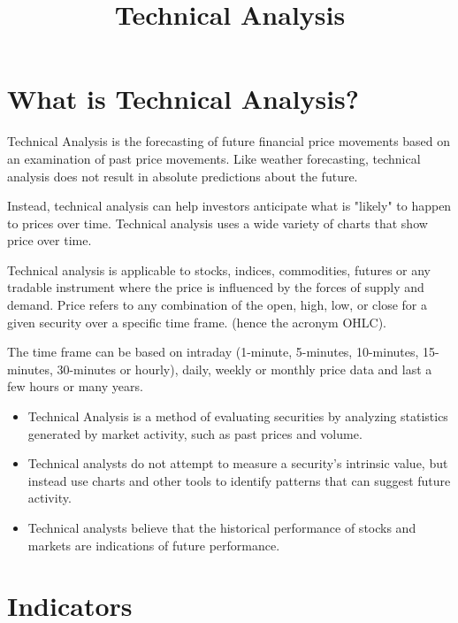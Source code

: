 \documentclass[]{article}
\title{Technical Analysis}
\begin{document}
\maketitle


\section{What is Technical Analysis?}

Technical Analysis is the forecasting of future financial price movements based on an examination of past price movements. Like weather forecasting, technical analysis does not result in absolute predictions about the future. 
\newline

Instead, technical analysis can help investors anticipate what is "likely" to happen to prices over time. Technical analysis uses a wide variety of charts that show price over time.
\newline

Technical analysis is applicable to stocks, indices, commodities, futures or any tradable instrument where the price is influenced by the forces of supply and demand. Price refers to any combination of the open, high, low, or close for a given security over a specific time frame. (hence the acronym OHLC).
\newline

The time frame can be based on intraday (1-minute, 5-minutes, 10-minutes, 15-minutes, 30-minutes or hourly), daily, weekly or monthly price data and last a few hours or many years. 

\begin{itemize} 
\item Technical Analysis is a method of evaluating securities by analyzing 
statistics generated by market activity, such as past prices and volume. 

\item Technical analysts do not attempt to measure a security's intrinsic value, but instead use charts and other tools to identify patterns that can suggest future activity.

\item Technical analysts believe that the historical performance of stocks and markets are indications of future performance. 
\end{itemize}

\section{Indicators}
\end{document}
